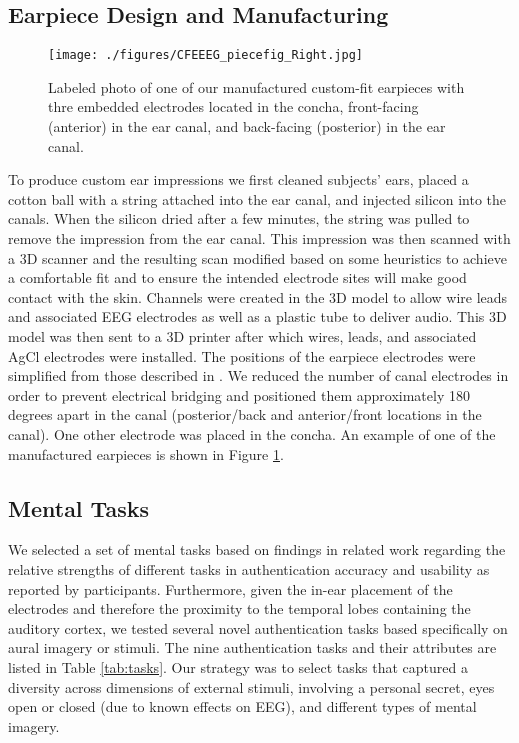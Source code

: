 \documentclass{sigchi}
\begin{document}
\subsection{Earpiece Design and Manufacturing}

\begin{figure}[t]
\centering
\texttt{[image: ./figures/CFEEEG\_piecefig\_Right.jpg]}
\caption{Labeled photo of one of our manufactured custom-fit earpieces with thre embedded electrodes located in the concha, front-facing (anterior) in the ear canal, and back-facing (posterior) in the ear canal.}
\label{fig:earpiece_diagram}
\end{figure}

To produce custom ear impressions we first cleaned subjects' ears, placed a cotton ball with a string attached into the ear canal, and injected silicon into the canals. When the silicon dried after a few minutes, the string was pulled to remove the impression from the ear canal. This impression was then scanned with a 3D scanner and the resulting scan modified based on some heuristics to achieve a comfortable fit and to ensure the intended electrode sites will make good contact with the skin. Channels were created in the 3D model to allow wire leads and associated EEG electrodes as well as a plastic tube to deliver audio. This 3D model was then sent to a 3D printer after which wires, leads, and associated AgCl electrodes were installed. The positions of the earpiece electrodes were simplified from those described in \cite{Mikkelsen2015}. We reduced the number of canal electrodes in order to prevent electrical bridging and positioned them approximately 180 degrees apart in the canal (posterior/back and anterior/front locations in the canal). One other electrode was placed in the concha. An example of one of the manufactured earpieces is shown in Figure \ref{fig:earpiece_diagram}.

\subsection{Mental Tasks}

We selected a set of mental tasks based on findings in related work regarding the relative strengths of different tasks in authentication accuracy and usability as reported by participants. \cite{Chuang2013b, curran2016passthoughts} Furthermore, given the in-ear placement of the electrodes and therefore the proximity to the temporal lobes containing the auditory cortex, we tested several novel authentication tasks based specifically on aural imagery or stimuli. The nine authentication tasks and their attributes are listed in Table \ref{tab:tasks}. Our strategy was to select tasks that captured a diversity across dimensions of external stimuli, involving a personal secret, eyes open or closed (due to known effects on EEG), and different types of mental imagery.
\end{document}
